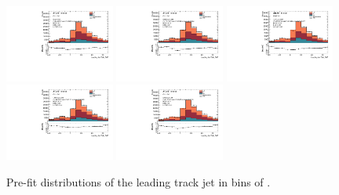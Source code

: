 \begin{figure}[htbp]
  \centering
 \includegraphics[width=0.32\textwidth]{figures/gbb/Sub_Sd0_Fits/Canv_PreFit_0-Deltaphi-0628_LpT_INF_SpT_INF_coarse_x.pdf}
 \includegraphics[width=0.32\textwidth]{figures/gbb/Sub_Sd0_Fits/Canv_PreFit_0628-Deltaphi-1256_LpT_INF_SpT_INF_coarse_x.pdf}
 \includegraphics[width=0.32\textwidth]{figures/gbb/Sub_Sd0_Fits/Canv_PreFit_1256-Deltaphi-1884_LpT_INF_SpT_INF_coarse_x.pdf}\\
 \includegraphics[width=0.32\textwidth]{figures/gbb/Sub_Sd0_Fits/Canv_PreFit_1884-Deltaphi-2512_LpT_INF_SpT_INF_coarse_x.pdf}
 \includegraphics[width=0.32\textwidth]{figures/gbb/Sub_Sd0_Fits/Canv_PreFit_2512-Deltaphi-3140_LpT_INF_SpT_INF_coarse_x.pdf}

\caption{Pre-fit \subsdzero distributions of the leading track jet in bins of \dphi. }
  \label{fig:dphi-prefits-leading}
\end{figure}


